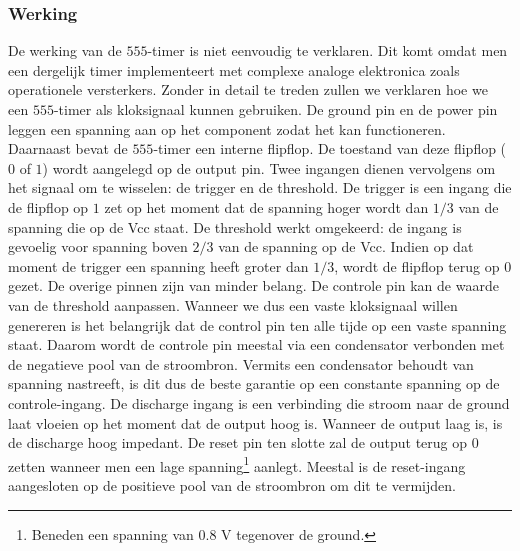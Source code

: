 \subsubsection{Werking}
De werking van de $555$-timer is niet eenvoudig te verklaren. Dit komt omdat men een dergelijk timer implementeert met complexe analoge elektronica zoals operationele versterkers. Zonder in detail te treden zullen we verklaren hoe we een $555$-timer als kloksignaal kunnen gebruiken. De ground pin en de power pin leggen een spanning aan op het component zodat het kan functioneren. Daarnaast bevat de $555$-timer een interne flipflop. De toestand van deze flipflop ($0$ of $1$) wordt aangelegd op de output pin. Twee ingangen dienen vervolgens om het signaal om te wisselen: de \mbox{trigger} en de \mbox{threshold}. De \mbox{trigger} is een ingang die de flipflop op $1$ zet op het moment dat de spanning hoger wordt dan $1/3$  van de spanning die op de \mbox{Vcc} staat. De \mbox{threshold} werkt omgekeerd: de ingang is gevoelig voor spanning boven $2/3$ van de spanning op de \mbox{Vcc}. Indien op dat moment de trigger een spanning heeft groter dan $1/3$, wordt de flipflop terug op $0$ gezet. De overige pinnen zijn van minder belang. De controle pin kan de waarde van de threshold aanpassen. Wanneer we dus een vaste kloksignaal willen genereren is het belangrijk dat de control pin ten alle tijde op een vaste spanning staat. Daarom wordt de controle pin meestal via een condensator verbonden met de negatieve pool van de stroombron. Vermits een condensator behoudt van spanning nastreeft, is dit dus de beste garantie op een constante spanning op de controle-ingang. De \mbox{discharge} ingang is een verbinding die stroom naar de ground laat vloeien op het moment dat de \mbox{output} hoog is. Wanneer de \mbox{output} laag is, is de \mbox{discharge} hoog impedant. De \mbox{reset} pin ten slotte zal de output terug op $0$ zetten wanneer men een lage spanning\footnote{Beneden een spanning van $0.8\mbox{ V}$ tegenover de ground.} aanlegt. Meestal is de \mbox{reset}-ingang aangesloten op de positieve pool van de stroombron om dit te vermijden.
